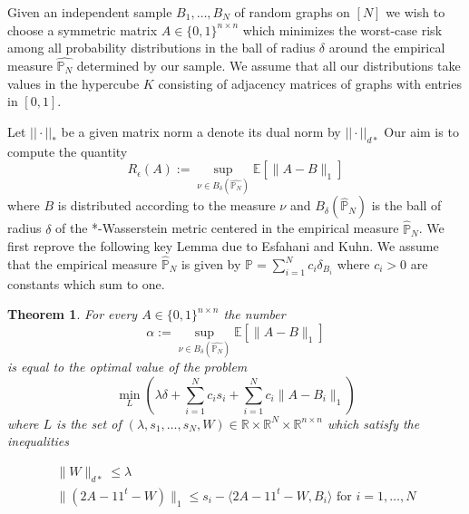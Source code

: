 \documentclass[12pt]{amsart}
\newtheorem{theorem}[lemma]{Theorem}
\numberwithin{equation}{section}
\newcommand{\PP}{\mathbb{P}}
\newcommand{\RR}{\mathbb{R}}
\newcommand{\EE}{\mathbb{E}}
\begin{document}
Given an independent sample $B_1,\dots, B_N$ of random graphs on $[N]$ we wish to choose a symmetric matrix $A\in \{0,1\}^{n\times n}$ which minimizes the worst-case risk among all probability distributions in the ball of radius $\delta$ around the empirical measure $\hat{\mathbb{P}_N}$ determined by our sample. We assume that all our distributions take values in the hypercube $K$ consisting of adjacency matrices of graphs with entries in $[0,1]$. 

Let $||\cdot||_{*}$ be a given matrix norm a denote its dual norm by $||\cdot||_{d*}$ Our aim is to compute the quantity
\[R_{\epsilon}(A):=\sup_{\nu\in B_{\delta}(\hat{\mathbb{P}_N})}\EE[\|A-B\|_1]\]
where $B$ is distributed according to the measure $\nu$ and $B_\delta(\hat{\mathbb{P}}_N)$ is the ball of radius $\delta$ of the *-Wasserstein metric centered in the empirical measure $\hat{\mathbb{P}}_N$. We first reprove the following key Lemma due to Esfahani and Kuhn. We assume that the empirical measure $\hat{\mathbb{P}}_N$ is given by $\PP=\sum_{i=1}^Nc_i\delta_{B_i}$ where $c_i>0$ are constants which sum to one. 

\begin{theorem}
\label{teoError}
For every $A\in \{0,1\}^{n\times n}$ the number \[\alpha:=\sup_{\nu\in B_{\delta}(\hat{\mathbb{P}_N})} \EE[\|A-B\|_1]\]
is equal to the optimal value of the problem
\[\min_{L} \left(\lambda\delta +\sum_{i=1}^N c_is_i+\sum_{i=1}^Nc_i\|A-B_i\|_1\right)\]
where $L$ is the set of $(\lambda, s_1,\dots, s_N, W)\in \RR\times\RR^N\times \RR^{n\times n}$ which satisfy the inequalities
\begin{center}
\[
\begin{array}{l}
\|W\|_{d*}\leq \lambda\\
\|(2A-11^t-W)\|_{1}\leq s_i-\langle 2A-11^t-W, B_i\rangle\text{ for $i=1,\dots, N$}
\end{array}
\]
\end{center}

\end{theorem}
\end{document}
